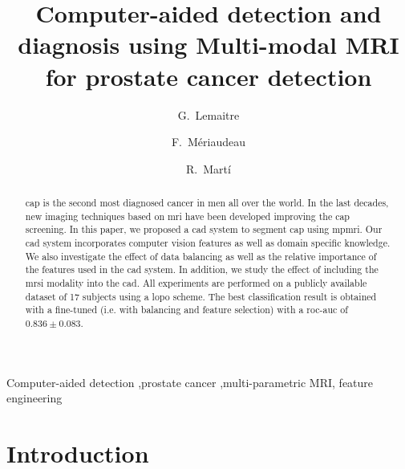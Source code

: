 \documentclass[final,3p,times,twocolumn]{elsarticle}
\begin{document}
\begin{frontmatter}


  \title{Computer-aided detection and diagnosis using Multi-modal MRI for
    prostate cancer detection}

  \author[label1]{G.~Lemaitre}
  \author[label2]{F.~M\'eriaudeau}
  \author[label3]{R.~Mart\'i}

  \address[label1]{Parietal team, Inria, CEA, Universit\'e Paris-Saclay, 1 Rue
    Honor\'e d'Estienne d'Orves, 91120 Palaiseau}
  \address[label2]{LE2I UMR6306, CNRS, Arts et M\'etiers, Univ. Bourgogne
    Franche-Comt\'e, 12 rue de la Fonderie, 71200 Le Creusot}
  \address[label3]{ViCOROB, Universitat de Girona, Campus Montilivi, Edifici P4,
    17071 Girona}

  \begin{abstract}

    \Ac{cap} is the second most diagnosed cancer in men all over the
    world. In the last decades, new imaging techniques based on \ac{mri} have
    been developed improving the \ac{cap} screening. In this paper, we
    proposed a \ac{cad} system to segment \ac{cap} using \ac{mpmri}. Our
    \ac{cad} system incorporates computer vision features as well as domain
    specific knowledge. We also investigate the effect of data balancing as
    well as the relative importance of the features used in the \ac{cad}
    system. In addition, we study the effect of including the \ac{mrsi}
    modality into the \ac{cad}. All experiments are performed on a publicly
    available dataset of 17 subjects using a \ac{lopo} scheme. The best
    classification result is obtained with a fine-tuned (i.e. with balancing
    and feature selection) with a \ac{roc}-\ac{auc} of $0.836 \pm 0.083$.

  \end{abstract}

  \begin{keyword}
    Computer-aided detection \sep prostate cancer \sep multi-parametric MRI\sep
    feature engineering
  \end{keyword}


\end{frontmatter}

\acresetall

\section{Introduction}
\end{document}
